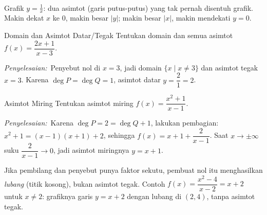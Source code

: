 \documentclass[11pt,a4paper]{report}
\theoremstyle{gaya}
\newcommand{\jawab}{\par\smallskip\noindent\textit{\textcolor{oranye}{Penyelesaian:}}\ }
\begin{document}
\begin{center}
\\
\small Grafik $y=\tfrac{1}{x}$: dua asimtot (garis putus-putus) yang tak pernah disentuh grafik. Makin dekat $x$ ke $0$, makin besar $|y|$; makin besar $|x|$, makin mendekati $y=0$.
\end{center}

\begin{contoh}{Domain dan Asimtot Datar/Tegak}
Tentukan domain dan semua asimtot $f(x)=\dfrac{2x+1}{x-3}$.

\jawab Penyebut nol di $x=3$, jadi domain $\{x\mid x\neq 3\}$ dan asimtot tegak $x=3$. Karena $\deg P=\deg Q=1$, asimtot datar $y=\dfrac{2}{1}=2$.
\end{contoh}

\begin{contoh}{Asimtot Miring}
Tentukan asimtot miring $f(x)=\dfrac{x^2+1}{x-1}$.

\jawab Karena $\deg P=2=\deg Q+1$, lakukan pembagian: $x^2+1=(x-1)(x+1)+2$, sehingga $f(x)=x+1+\dfrac{2}{x-1}$. Saat $x\to\pm\infty$ suku $\dfrac{2}{x-1}\to 0$, jadi asimtot miringnya $y=x+1$.
\end{contoh}

\begin{kesalahan}
Jika pembilang dan penyebut punya faktor sekutu, pembuat nol itu menghasilkan \emph{lubang} (titik kosong), bukan asimtot tegak. Contoh $f(x)=\dfrac{x^2-4}{x-2}=x+2$ untuk $x\neq2$: grafiknya garis $y=x+2$ dengan lubang di $(2,4)$, tanpa asimtot tegak.
\end{kesalahan}
\end{document}
